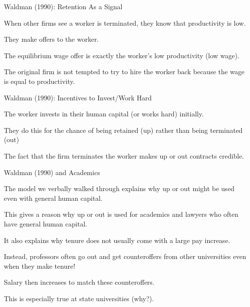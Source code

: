 \documentclass[aspectratio=169,usenames,dvipsnames]{beamer}
\newenvironment{wideitemize}{\itemize\addtolength{\itemsep}{10pt}}{\enditemize}
\begin{document}
\begin{frame}{Waldman (1990): Retention As a Signal}
\begin{wideitemize}
    \item When other firms see a worker is terminated, they know that productivity is low.
    \item They make offers to the worker.
    \item The equilibrium wage offer is exactly the worker's low productivity (low wage).
    \item The original firm is not tempted to try to hire the worker back because the wage is equal to productivity.
\end{wideitemize}
    
\end{frame}

\begin{frame}{Waldman (1990): Incentives to Invest/Work Hard}
\begin{wideitemize}
    \item The worker invests in their human capital (or works hard) initially.
    \item They do this for the chance of being retained (up) rather than being terminated (out)
    \item The fact that the firm terminates the worker makes up or out contracts credible.
\end{wideitemize}
    
\end{frame}

\begin{frame}{Waldman (1990) and Academics}

\begin{wideitemize}
    \item The model we verbally walked through explains why up or out might be used even with general human capital.
    \item This gives a reason why up or out is used for academics and lawyers who often have general human capital.
    \item It also explains why tenure does not usually come with a large pay increase.
    \item Instead, professors often go out and get counteroffers from other universities even when they make tenure!
    \item Salary then increases to match these counteroffers.
    \item This is especially true at state universities (why?).
\end{wideitemize}
    
\end{frame}
\end{document}
